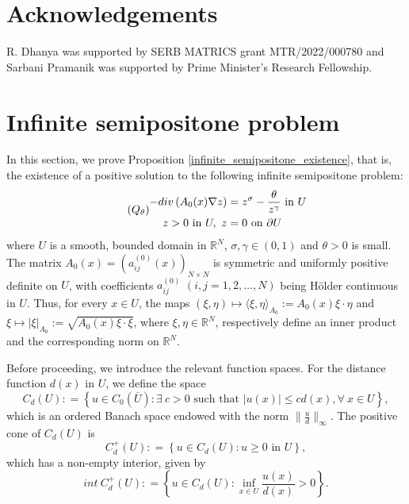 \documentclass[reqno,oneside]{amsart}
\theoremstyle{definition}
\theoremstyle{remark}
\numberwithin{equation}{section}
\newcommand{\sr}{\mathbb{R}}
\newcommand{\pa}{\partial}
\newcommand{\na} {\nabla}
\newcommand{\si}{\sigma}
\begin{document}

\section*{Acknowledgements}
R. Dhanya was supported by SERB MATRICS grant MTR/2022/000780 and Sarbani Pramanik was supported by Prime Minister's Research Fellowship.


\appendix

\section{Infinite semipositone problem}\label{appendix_infinite_semipositone}

In this section, we prove Proposition \ref{infinite_semipositone_existence}, that is, the existence of a positive solution to the following infinite semipositone problem:
\begin{equation}\tag{$Q_{\theta}$}
\begin{aligned}
    -div \left(A_0 (x) \na z \right) &= z^{\si} - \frac{\theta}{z^{\gamma}} \text{ in } U\\
    z > 0 \text{ in } U,\ z &= 0 \text{ on } \pa U
\end{aligned}
\end{equation}
where $U$ is a smooth, bounded domain in $\sr^N$, $\si, \gamma \in (0, 1)$ and $\theta>0$ is small. The matrix $A_0(x) = \left(a^{(0)}_{ij}(x)\right)_{N\times N}$ is symmetric and uniformly positive definite on $U$, with coefficients $a^{(0)}_{ij}$ $(i,j = 1,2,\dots, N)$ being H\"older continuous in $U$. Thus, for every $x\in U$, the maps $(\xi, \eta) \mapsto \langle \xi, \eta \rangle_{A_0}:= A_0(x) \xi \cdot \eta$ and $\xi \mapsto |\xi|_{A_0}:= \sqrt{A_0(x)\xi \cdot \xi}$, where $\xi, \eta \in \sr^N$, respectively define an inner product and the corresponding norm on $\sr^N$.

Before proceeding, we introduce the relevant function spaces. For the distance function $d(x)$ in $U$, we define the space
\[C_{d} (U): = \left\{ u\in C_0 (\overline{U}) : \exists\ c>0 \text{ such that } |u(x)|\leq c d(x), \forall\ x\in U \right\},\]
which is an ordered Banach space endowed with the norm $\|\frac{u}{d}\|_{\infty}.$ The positive cone of $C_{d} (U)$ is
\[C_d^+ (U): = \left\{ u\in C_d (U) : u \geq 0 \text{ in } U \right\},\]
which has a non-empty interior, given by
\[int \ C_d^+ (U): = \left\{ u\in C_d (U) : \inf_{x\in U} \frac{u(x)}{d(x)} >0 \right\}.\]
\end{document}
